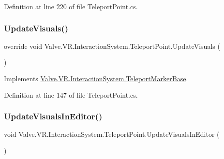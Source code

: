 Definition at line 220 of file Teleport\+Point.\+cs.

\mbox{\label{class_valve_1_1_v_r_1_1_interaction_system_1_1_teleport_point_aa62afea7412cbca6a7e5016b4a5788c6}} 
\subsubsection{\texorpdfstring{UpdateVisuals()}{UpdateVisuals()}}
{\footnotesize\ttfamily override void Valve.\+V\+R.\+Interaction\+System.\+Teleport\+Point.\+Update\+Visuals (\begin{DoxyParamCaption}{ }\end{DoxyParamCaption})\hspace{0.3cm}{\ttfamily [virtual]}}



Implements \mbox{\hyperlink{class_valve_1_1_v_r_1_1_interaction_system_1_1_teleport_marker_base_a5faad5c973035110d88fec8ed93e91ff}{Valve.\+V\+R.\+Interaction\+System.\+Teleport\+Marker\+Base}}.



Definition at line 147 of file Teleport\+Point.\+cs.

\mbox{\label{class_valve_1_1_v_r_1_1_interaction_system_1_1_teleport_point_a1389539bcb637fce7f8622b5c06c37ec}} 
\subsubsection{\texorpdfstring{UpdateVisualsInEditor()}{UpdateVisualsInEditor()}}
{\footnotesize\ttfamily void Valve.\+V\+R.\+Interaction\+System.\+Teleport\+Point.\+Update\+Visuals\+In\+Editor (\begin{DoxyParamCaption}{ }\end{DoxyParamCaption})}



